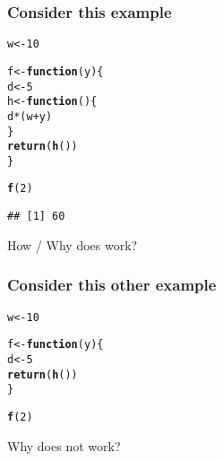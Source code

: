 \documentclass[12pt]{beamer}\usepackage[]{graphicx}\usepackage[]{color}
\makeatletter
\newcommand{\hlnum}[1]{\textcolor[rgb]{0.686,0.059,0.569}{#1}}%
\newcommand{\hlopt}[1]{\textcolor[rgb]{0,0,0}{#1}}%
\newcommand{\hlstd}[1]{\textcolor[rgb]{0.345,0.345,0.345}{#1}}%
\newcommand{\hlkwa}[1]{\textcolor[rgb]{0.161,0.373,0.58}{\textbf{#1}}}%
\newcommand{\hlkwb}[1]{\textcolor[rgb]{0.69,0.353,0.396}{#1}}%
\newcommand{\hlkwc}[1]{\textcolor[rgb]{0.333,0.667,0.333}{#1}}%
\newcommand{\hlkwd}[1]{\textcolor[rgb]{0.737,0.353,0.396}{\textbf{#1}}}%
\newenvironment{kframe}{%
 \def\at@end@of@kframe{}%
 \ifinner\ifhmode%
  \def\at@end@of@kframe{\end{minipage}}%
  \begin{minipage}{\columnwidth}%
 \fi\fi%
 \def\FrameCommand##1{\hskip\@totalleftmargin \hskip-\fboxsep
 \colorbox{shadecolor}{##1}\hskip-\fboxsep
     \hskip-\linewidth \hskip-\@totalleftmargin \hskip\columnwidth}%
 \MakeFramed {\advance\hsize-\width
   \@totalleftmargin\z@ \linewidth\hsize
   \@setminipage}}%
 {\par\unskip\endMakeFramed%
 \at@end@of@kframe}
\newenvironment{knitrout}{}{} %
\makeatother
\begin{document}

\begin{frame}
\begin{center}
\Huge{}
\end{center}
\end{frame}


\begin{frame}[fragile]
\frametitle{Consider this example}

\begin{knitrout}\footnotesize
{}\color{fgcolor}\begin{kframe}
\begin{alltt}
\hlstd{w} \hlkwb{<-} \hlnum{10}

\hlstd{f} \hlkwb{<-} \hlkwa{function}\hlstd{(}\hlkwc{y}\hlstd{) \{}
  \hlstd{d} \hlkwb{<-} \hlnum{5}
  \hlstd{h} \hlkwb{<-} \hlkwa{function}\hlstd{() \{}
    \hlstd{d} \hlopt{*} \hlstd{(w} \hlopt{+} \hlstd{y)}
  \hlstd{\}}
  \hlkwd{return}\hlstd{(}\hlkwd{h}\hlstd{())}
\hlstd{\}}

\hlkwd{f}\hlstd{(}\hlnum{2}\hlstd{)}
\end{alltt}
\begin{verbatim}
## [1] 60
\end{verbatim}
\end{kframe}
\end{knitrout}

How / Why does  work?

\end{frame}


\begin{frame}[fragile]
\frametitle{Consider this other example}

\begin{knitrout}\footnotesize
{}\color{fgcolor}\begin{kframe}
\begin{alltt}
\hlstd{w} \hlkwb{<-} \hlnum{10}

\hlstd{f} \hlkwb{<-} \hlkwa{function}\hlstd{(}\hlkwc{y}\hlstd{) \{}
  \hlstd{d} \hlkwb{<-} \hlnum{5}
  \hlkwd{return}\hlstd{(}\hlkwd{h}\hlstd{())}
\hlstd{\}}

\hlkwd{f}\hlstd{(}\hlnum{2}\hlstd{)}
\end{alltt}


{\ttfamily\noindent\bfseries{}}\end{kframe}
\end{knitrout}

Why  does not work?

\end{frame}
\end{document}
